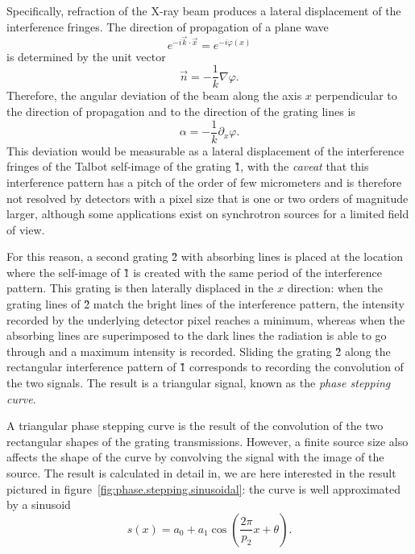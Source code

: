 Specifically, refraction of the X-ray beam produces a lateral displacement
of the interference fringes. The direction of propagation of a plane wave
\begin{equation}
    e^{-i \vec{k} \cdot \vec{x}} = e^{-i\varphi(x)}
    \label{eq:plane.wave}
\end{equation}
is determined by the unit vector
\begin{equation}
    \vec{n} = -\frac{1}{k} \nabla\varphi.
    \label{eq:plane.wave.direction}
\end{equation}
Therefore, the angular deviation of the beam along the axis $x$ perpendicular to
the direction of propagation and to the direction of the grating lines is
\begin{equation}
        \alpha = -\frac{1}{k} \partial_x\varphi.\label{eq:refraction.angle}
\end{equation}
This deviation would be measurable as a lateral displacement of the
interference fringes of the Talbot self-image of the grating \G1, with the
\emph{caveat} that this interference pattern has a pitch of the order of
few micrometers and is therefore not resolved by detectors with a pixel size
that is one or two orders of magnitude larger, although some applications
exist on synchrotron sources for a limited field of view\cn.

For this reason, a second grating \G2 with absorbing lines is placed at the
location where the self-image of \G1 is created with the same period of the
interference pattern. This grating is then laterally displaced in the $x$
direction: when the grating lines of \G2
match the bright lines of the interference pattern, the intensity recorded
by the underlying detector pixel reaches a minimum, whereas when the
absorbing lines are superimposed to the dark lines the radiation is able to
go through and a maximum intensity is recorded. Sliding the grating \G2
along the rectangular interference pattern of \G1 corresponds to recording
the convolution of the two signals. The result is a triangular signal, known
as the \emph{phase stepping curve}.

A triangular phase stepping curve is the result of the convolution of the
two rectangular shapes of the grating transmissions. However, a finite
source size also affects the shape of the curve by convolving the signal
with the image of the source. The result is calculated in detail in\cn, we
are here interested in the result pictured in
figure~\ref{fig:phase.stepping.sinusoidal}: the curve is well approximated by a
sinusoid
\begin{equation*}
    s(x) = a_0 + a_1 \cos \left(\frac{2 \pi}{p_2} x + \theta\right).
\end{equation*}

